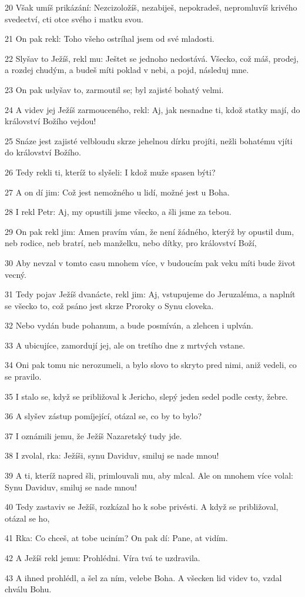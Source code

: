 \par 20 Však umíš prikázání: Nezcizoložíš, nezabiješ, nepokradeš, nepromluvíš krivého svedectví, cti otce svého i matku svou.
\par 21 On pak rekl: Toho všeho ostríhal jsem od své mladosti.
\par 22 Slyšav to Ježíš, rekl mu: Ještet se jednoho nedostává. Všecko, což máš, prodej, a rozdej chudým, a budeš míti poklad v nebi, a pojd, následuj mne.
\par 23 On pak uslyšav to, zarmoutil se; byl zajisté bohatý velmi.
\par 24 A videv jej Ježíš zarmouceného, rekl: Aj, jak nesnadne ti, kdož statky mají, do království Božího vejdou!
\par 25 Snáze jest zajisté velbloudu skrze jehelnou dírku projíti, nežli bohatému vjíti do království Božího.
\par 26 Tedy rekli ti, kteríž to slyšeli: I kdož muže spasen býti?
\par 27 A on dí jim: Což jest nemožného u lidí, možné jest u Boha.
\par 28 I rekl Petr: Aj, my opustili jsme všecko, a šli jsme za tebou.
\par 29 On pak rekl jim: Amen pravím vám, že není žádného, kterýž by opustil dum, neb rodice, neb bratrí, neb manželku, nebo dítky, pro království Boží,
\par 30 Aby nevzal v tomto casu mnohem více, v budoucím pak veku míti bude život vecný.
\par 31 Tedy pojav Ježíš dvanácte, rekl jim: Aj, vstupujeme do Jeruzaléma, a naplnít se všecko to, což psáno jest skrze Proroky o Synu cloveka.
\par 32 Nebo vydán bude pohanum, a bude posmíván, a zlehcen i uplván.
\par 33 A ubicujíce, zamordují jej, ale on tretího dne z mrtvých vstane.
\par 34 Oni pak tomu nic nerozumeli, a bylo slovo to skryto pred nimi, aniž vedeli, co se pravilo.
\par 35 I stalo se, když se približoval k Jericho, slepý jeden sedel podle cesty, žebre.
\par 36 A slyšev zástup pomíjející, otázal se, co by to bylo?
\par 37 I oznámili jemu, že Ježíš Nazaretský tudy jde.
\par 38 I zvolal, rka: Ježíši, synu Daviduv, smiluj se nade mnou!
\par 39 A ti, kteríž napred šli, primlouvali mu, aby mlcal. Ale on mnohem více volal: Synu Daviduv, smiluj se nade mnou!
\par 40 Tedy zastaviv se Ježíš, rozkázal ho k sobe privésti. A když se približoval, otázal se ho,
\par 41 Rka: Co chceš, at tobe uciním? On pak dí: Pane, at vidím.
\par 42 A Ježíš rekl jemu: Prohlédni. Víra tvá te uzdravila.
\par 43 A ihned prohlédl, a šel za ním, velebe Boha. A všecken lid videv to, vzdal chválu Bohu.

